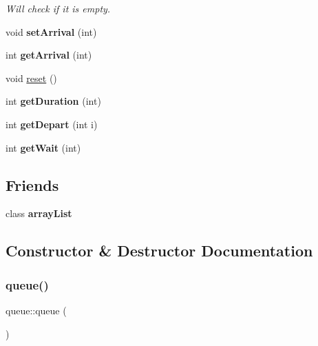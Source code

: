 \begin{DoxyCompactItemize}
\begin{DoxyCompactList}\small\item\em Will check if it is empty. \end{DoxyCompactList}\item 
\mbox{\label{classqueue_a5b2c45aaf34544f8dc28c9d2406f64c0}} 
void {\bfseries set\+Arrival} (int)
\item 
\mbox{\label{classqueue_a43d5d4ff4e2f61b4cb928f5c6d01e4ad}} 
int {\bfseries get\+Arrival} (int)
\item 
void \mbox{\hyperlink{classqueue_a4c691b7156868dd42856defa80f2c182}{reset}} ()
\item 
\mbox{\label{classqueue_ae9d8645579f32bbd52359258bcbf3540}} 
int {\bfseries get\+Duration} (int)
\item 
\mbox{\label{classqueue_a0e6ea71fbe818a22773b54661ec1fca5}} 
int {\bfseries get\+Depart} (int i)
\item 
\mbox{\label{classqueue_a79ac2e868e7ff728f66f1a3416a5e543}} 
int {\bfseries get\+Wait} (int)
\end{DoxyCompactItemize}
\subsection*{Friends}
\begin{DoxyCompactItemize}
\item 
\mbox{\label{classqueue_a36bd06a0a4b5ace1bd02e8242623acfa}} 
class {\bfseries array\+List}
\end{DoxyCompactItemize}


\subsection{Constructor \& Destructor Documentation}
\mbox{\label{classqueue_a7d34ca890402e85d02107280b32ae73a}} 
\subsubsection{\texorpdfstring{queue()}{queue()}}
{\footnotesize\ttfamily queue\+::queue (\begin{DoxyParamCaption}{ }\end{DoxyParamCaption})}



